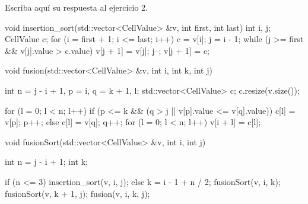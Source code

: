 Escriba aquí su respuesta al ejercicio 2.

\begin{lslisting}
void insertion_sort(std::vector<CellValue> &v, int first, int last)
{
    int i, j;
    CellValue c;
    for (i = first + 1; i <= last; i++)
    {
        c = v[i];
        j = i - 1;
        while (j >= first && v[j].value > c.value)
        {
            v[j + 1] = v[j];
            j--;
        }
        v[j + 1] = c;
    }
}

void fusion(std::vector<CellValue> &v, int i, int k, int j)
{
    int n = j - i + 1, p = i, q = k + 1, l;
    std::vector<CellValue> c;
    c.resize(v.size());

    for (l = 0; l < n; l++)
    {
        if (p <= k && (q > j || v[p].value <= v[q].value))
        {
            c[l] = v[p];
            p++;
        }
        else
        {
            c[l] = v[q];
            q++;
        }
    }
    for (l = 0; l < n; l++)
        v[i + l] = c[l];
}

void fusionSort(std::vector<CellValue> &v, int i, int j)
{
    int n = j - i + 1;
    int k;

    if (n <= 3)
        insertion_sort(v, i, j);
    else
    {
        k = i - 1 + n / 2;
        fusionSort(v, i, k);
        fusionSort(v, k + 1, j);
        fusion(v, i, k, j);
    }
}
\end{lslisting}